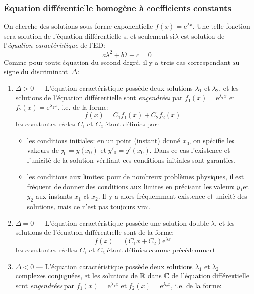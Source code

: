 \subsubsection{Équation différentielle homogène à coefficients constants} On cherche des solutions sous forme exponentielle $f(x) = \mathrm{e}^{\lambda x}$. Une telle fonction sera solution de l'équation différentielle si et seulement si$\lambda$ est solution de l'\emph{équation caractéristique} de l'ED:
\begin{equation}
a\lambda^2 + b\lambda + c = 0
\end{equation}
Comme pour toute équation du second degré, il y a trois cas correspondant au signe du discriminant~$\Delta$:
\begin{enumerate}
\item$\Delta>0$ --- L'équation caractéristique possède deux solutions $\lambda_1$ et $\lambda_2$, et les solutions de l'équation différentielle sont \emph{engendrées} par $f_1(x) = \mathrm{e}^{\lambda_1x}$ et $f_2(x) = \mathrm{e}^{\lambda_2x}$, i.e. de la forme:
\begin{equation}
f(x) = C_1f_1(x) + C_2f_2(x)
\end{equation}
les constantes réeles $C_1$ et $C_2$ étant définies par: 
\begin{itemize} 
\item les conditions initiales: en un point (instant) donné $x_0$, on spécifie les vakeurs de $y_0=y(x_0)$ et $y'_0=y'(x_0)$. Dans ce cas l'existence et l'unicité de la solution vérifiant ces conditions initiales sont garanties. 
\item les conditions aux limites: pour de nombreux problèmes physiques, il est fréquent de donner des conditions aux limites en précisant les valeurs $y_1$et $y_2$ aux instants $x_1$ et $x_2$. Il y a alors fréquemment existence et unicité des solutions, mais ce n'est pas toujours vrai. 
\end{itemize} 
\item$\Delta=0$ --- L'équation caractéristique possède une solution double $\lambda$, et les solutions de l'équation différentielle sont de la forme:
\begin{equation}
f(x) = (C_1 x + C_2)\mathrm{e}^{\lambda x}
\end{equation}
les constantes réelles $C_1$ et $C_2$ étant définies comme précédemment. 
\item$\Delta<0$ --- L'équation caractéristique possède deux solutions $\lambda_1$ et $\lambda_2$ complexes conjuguées, et les solutions de $\mathbb R$ dans $\mathbb C$ de l'équation différentielle sont \emph{engendrées} par $f_1(x) = \mathrm{e}^{\lambda_1x}$ et $f_2(x) = \mathrm{e}^{\lambda_2x}$, i.e. de la forme:

\end{enumerate}
